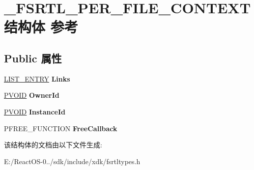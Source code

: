 \hypertarget{struct___f_s_r_t_l___p_e_r___f_i_l_e___c_o_n_t_e_x_t}{}\section{\+\_\+\+F\+S\+R\+T\+L\+\_\+\+P\+E\+R\+\_\+\+F\+I\+L\+E\+\_\+\+C\+O\+N\+T\+E\+X\+T结构体 参考}
\label{struct___f_s_r_t_l___p_e_r___f_i_l_e___c_o_n_t_e_x_t}
\subsection*{Public 属性}
\begin{DoxyCompactItemize}
\item 
\mbox{\label{struct___f_s_r_t_l___p_e_r___f_i_l_e___c_o_n_t_e_x_t_a41a9673a648938f5e325c15d67942367}} 
\hyperlink{struct___l_i_s_t___e_n_t_r_y}{L\+I\+S\+T\+\_\+\+E\+N\+T\+RY} {\bfseries Links}
\item 
\mbox{\label{struct___f_s_r_t_l___p_e_r___f_i_l_e___c_o_n_t_e_x_t_a7cc01145c89d6e6b48a865f04c8f77af}} 
\hyperlink{interfacevoid}{P\+V\+O\+ID} {\bfseries Owner\+Id}
\item 
\mbox{\label{struct___f_s_r_t_l___p_e_r___f_i_l_e___c_o_n_t_e_x_t_a0855d30346bfb723afcc93679e6e6ad8}} 
\hyperlink{interfacevoid}{P\+V\+O\+ID} {\bfseries Instance\+Id}
\item 
\mbox{\label{struct___f_s_r_t_l___p_e_r___f_i_l_e___c_o_n_t_e_x_t_aee08c5b03e0388e24dd6102548595c29}} 
P\+F\+R\+E\+E\+\_\+\+F\+U\+N\+C\+T\+I\+ON {\bfseries Free\+Callback}
\end{DoxyCompactItemize}


该结构体的文档由以下文件生成\+:\begin{DoxyCompactItemize}
\item 
E\+:/\+React\+O\+S-\/0../sdk/include/xdk/fsrtltypes.\+h\end{DoxyCompactItemize}
